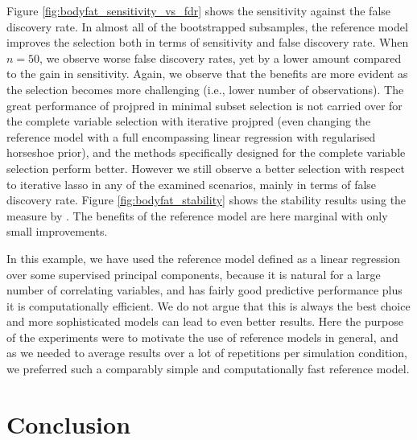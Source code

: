 \documentclass[a4]{article}
\theoremstyle{definition}
\begin{document}
Figure \ref{fig:bodyfat_sensitivity_vs_fdr} shows the sensitivity
against the false discovery rate.  In almost all of the bootstrapped
subsamples, the reference
model improves the selection both in terms of sensitivity and false
discovery rate. When $n=50$, we observe worse false
discovery rates, yet by a lower amount compared to the gain in
sensitivity. Again, we observe that the benefits are more evident as
the selection becomes more challenging (i.e., lower number of
observations).
The great performance of projpred in minimal subset selection is not
carried over for the complete variable selection with iterative
projpred (even changing the reference model with a full encompassing 
linear regression with regularised horseshoe prior), and the methods 
specifically designed for the complete variable selection perform better. 
However we still observe a better selection with respect to iterative lasso
in any of the examined scenarios, mainly in terms of false discovery rate.
Figure \ref{fig:bodyfat_stability} shows the stability
results using the measure by
\cite{paper:stability}. The benefits of the reference model are here
marginal with only small improvements.

In this example, we have used the reference model defined as a linear
regression over some supervised principal components, because it is
natural for a large number of correlating variables, and has fairly good
predictive performance plus it is computationally efficient. We do not
argue that this is always the best choice and more sophisticated
models can lead to even better results. Here the purpose of the
experiments were to motivate the use of reference models in general,
and as we needed to average results over a lot of repetitions per
simulation condition, we preferred such a comparably simple and
computationally fast reference model.

\hypertarget{conclusion}{
\section{Conclusion}\label{conclusion}}
\end{document}
